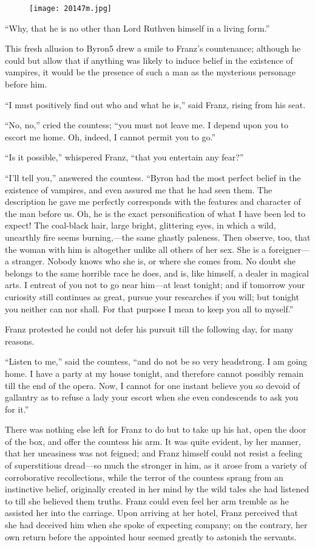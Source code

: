 \begin{figure}[ht]
\texttt{[image: 20147m.jpg]}
\end{figure}

“Why, that he is no other than Lord Ruthven himself in a living form.”

This fresh allusion to Byron5 drew a smile to Franz’s countenance;
although he could but allow that if anything was likely to induce
belief in the existence of vampires, it would be the presence of such a
man as the mysterious personage before him.

“I must positively find out who and what he is,” said Franz, rising
from his seat.

“No, no,” cried the countess; “you must not leave me. I depend upon you
to escort me home. Oh, indeed, I cannot permit you to go.”

“Is it possible,” whispered Franz, “that you entertain any fear?”

“I’ll tell you,” answered the countess. “Byron had the most perfect
belief in the existence of vampires, and even assured me that he had
seen them. The description he gave me perfectly corresponds with the
features and character of the man before us. Oh, he is the exact
personification of what I have been led to expect! The coal-black hair,
large bright, glittering eyes, in which a wild, unearthly fire seems
burning,—the same ghastly paleness. Then observe, too, that the woman
with him is altogether unlike all others of her sex. She is a
foreigner—a stranger. Nobody knows who she is, or where she comes from.
No doubt she belongs to the same horrible race he does, and is, like
himself, a dealer in magical arts. I entreat of you not to go near
him—at least tonight; and if tomorrow your curiosity still continues as
great, pursue your researches if you will; but tonight you neither can
nor shall. For that purpose I mean to keep you all to myself.”

Franz protested he could not defer his pursuit till the following day,
for many reasons.

“Listen to me,” said the countess, “and do not be so very headstrong. I
am going home. I have a party at my house tonight, and therefore cannot
possibly remain till the end of the opera. Now, I cannot for one
instant believe you so devoid of gallantry as to refuse a lady your
escort when she even condescends to ask you for it.”

There was nothing else left for Franz to do but to take up his hat,
open the door of the box, and offer the countess his arm. It was quite
evident, by her manner, that her uneasiness was not feigned; and Franz
himself could not resist a feeling of superstitious dread—so much the
stronger in him, as it arose from a variety of corroborative
recollections, while the terror of the countess sprang from an
instinctive belief, originally created in her mind by the wild tales
she had listened to till she believed them truths. Franz could even
feel her arm tremble as he assisted her into the carriage. Upon
arriving at her hotel, Franz perceived that she had deceived him when
she spoke of expecting company; on the contrary, her own return before
the appointed hour seemed greatly to astonish the servants.

